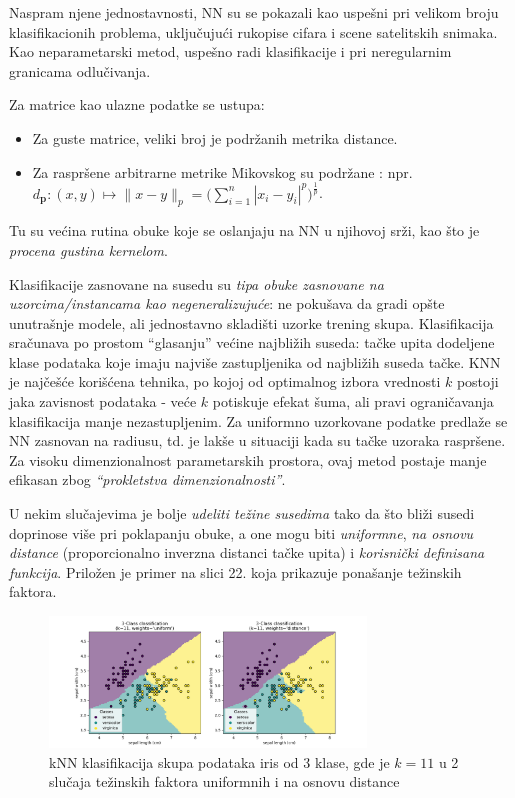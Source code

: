 \documentclass[fontsize=12bp, paper=a4]{scrarticle}
\begin{document}
Naspram njene jednostavnosti, NN su se pokazali kao uspešni pri velikom broju klasifikacionih problema, uključujući rukopise cifara i scene satelitskih snimaka. Kao neparametarski metod, uspešno radi klasifikacije i pri neregularnim granicama odlučivanja.

Za matrice kao ulazne podatke se ustupa:
\begin{itemize}
    \item Za guste matrice, veliki broj je podržanih metrika distance.
    \item Za raspršene arbitrarne metrike Mikovskog su podržane : npr. $d_{\mathbf{p}} : (x, y) \mapsto \|x-y\|_p = \bigg(\sum_{i=1}^{n} |x_i-y_i|^p\bigg)^\frac{1}{p}$.\cite{minkowski}\cite{distance}
\end{itemize}

Tu su većina rutina obuke koje se oslanjaju na NN u njihovoj srži, kao što je \textit{procena gustina kernelom}. 

Klasifikacije zasnovane na susedu su \textit{tipa obuke zasnovane na uzorcima/instancama kao negeneralizujuće}: ne pokušava da gradi opšte unutrašnje modele, ali jednostavno skladišti uzorke trening skupa. Klasifikacija sračunava po prostom ``glasanju'' većine najbližih suseda: tačke upita dodeljene klase podataka koje imaju najviše zastupljenika od najbližih suseda tačke. 
KNN je najčešće korišćena tehnika, po kojoj od optimalnog izbora vrednosti $k$ postoji jaka zavisnost podataka - veće $k$ potiskuje efekat šuma, ali pravi ograničavanja klasifikacija manje nezastupljenim. 
Za uniformno uzorkovane podatke predlaže se NN zasnovan na radiusu, td. je lakše u situaciji kada su tačke uzoraka raspršene. Za visoku dimenzionalnost parametarskih prostora, ovaj metod postaje manje efikasan zbog \textit{``prokletstva dimenzionalnosti''}.


U nekim slučajevima je bolje \textit{udeliti težine susedima} tako da što bliži susedi doprinose više pri poklapanju obuke, a one mogu biti \textit{uniformne}, \textit{na osnovu distance} (proporcionalno inverzna distanci tačke upita) i \textit{korisnički definisana funkcija}. Priložen je primer na slici 22. koja prikazuje ponašanje težinskih faktora.

\begin{figure}[h!]
    \centering
    \includegraphics[width=0.75\textwidth]{image-22.png}
    \caption{\centering kNN klasifikacija skupa podataka iris od 3 klase, gde je $k=11$ u 2 slučaja težinskih faktora uniformnih i na osnovu distance}
\end{figure}
\end{document}
